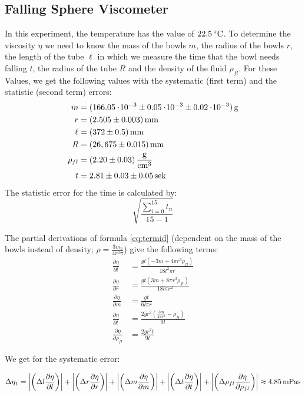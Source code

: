 \subsection{Falling Sphere Viscometer} \label{sec:aufgabe2}
In this experiment, the temperature has the value of $22.5\C$. To determine the viscosity $\eta$ we need to know the mass of the bowls $m$, the radius of the bowls $r$, the length of the tube $\ell$ in which we measure the time that the bowl needs falling $t$, the radius of the tube $R$ and the density of the fluid $\rho_{fl}$. For these Values, we get the following values with the systematic (first term) and the statistic (second term) errors:
\begin{align*}
m &= \unit[(166.05\e{-3} \pm 0.05\e{-3} \pm 0.02 \e{-3})]{g}\\
r &= \unit[(2.505 \pm 0.003)]{mm}\\
\ell &= \unit[(372 \pm 0.5)]{mm}\\
R &= \unit[(26,675 \pm 0.015)]{mm}\\
\rho_{fl} &= \unit[(2.20 \pm 0.03)]{\frac{g}{cm^3}}\\
t &= \unit[2.81 \pm 0.03 \pm 0.05]{sek}
\end{align*}
The statistic error for the time is calculated by:
\begin{equation*}
\sqrt{\frac{\sum_{i = 0}^{15}t_n}{15-1}}
\end{equation*}




The partial derivations of formula \ref{eq:termid} (dependent on the mass of the bowls instead of density; $\rho = \frac{3m_b}{4r^3\pi}$) give the following terms:
\begin{align*}
\frac{\partial \eta}{\partial l}  &= \frac{g t \left(-3 m+4 \pi  r^3 \rho_{fl}\right)}{18 l^2 \pi  r}\\
\frac{\partial \eta}{\partial r} &= \frac{g t \left(3 m+8 \pi  r^3 \rho_{fl}\right)}{18 l \pi  r^2}\\
\frac{\partial \eta}{\partial m} &= \frac{g t}{6 l \pi  r}\\
\frac{\partial \eta}{\partial t} &= \frac{2 g r^2 \left(\frac{3 m}{4 \pi  r^3}- \rho_{fl}\right)}{9 l}\\
\frac{\partial \eta}{\partial \rho_{fl}} &= \frac{2 g r^2 t}{9 l}
\end{align*}

We get for the systematic error:

\begin{equation}
\Delta\eta_1 = 
\abs{\left(\Delta l\frac{\partial \eta}{\partial l}\right)}
+
\abs{\left(\Delta r\frac{\partial \eta}{\partial r}\right)}
+
\abs{\left(\Delta m\frac{\partial \eta}{\partial m}\right)}
+
\abs{\left(\Delta t\frac{\partial \eta}{\partial t}\right)}
+
\abs{\left(\Delta \rho_{fl}\frac{\partial \eta}{\partial \rho_{fl}}\right)}
\approx \unit[4.85]{mPa s}
\end{equation}

